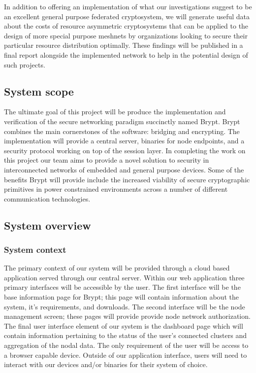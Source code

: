 \documentclass[tikz,a4paper,titlepage]{article}
\begin{document}
In addition to offering an implementation of what our investigations suggest to be an excellent general purpose federated cryptosystem, we will generate useful data about the costs of resource asymmetric cryptosystems that can be applied to the design of more special purpose meshnets by organizations looking to secure their particular resource distribution optimally. These findings will be published in a final report alongside the implemented network to help in the potential design of such projects.

\subsection{System scope}
The ultimate goal of this project will be produce the implementation and verification of the secure networking paradigm succinctly named Brypt. Brypt combines the main cornerstones of the software: bridging and encrypting. The implementation will provide a central server, binaries for node endpoints, and a security protocol working on top of the session layer. In completing the work on this project our team aims to provide a novel solution to security in interconnected networks of embedded and general purpose devices. Some of the benefits Brypt will provide include the increased viability of secure cryptographic primitives in power constrained environments across a number of different communication technologies. 

\subsection{System overview}
\subsubsection{System context}
The primary context of our system will be provided through a cloud based application served through our central server. Within our web application three primary interfaces will be accessible by the user. The first interface will be the base information page for Brypt; this page will contain information about the system, it’s requirements, and downloads. The second interface will be the node management screen; these pages will provide provide node network authorization. The final user interface element of our system is the dashboard page which will contain information pertaining to the status of the user’s connected clusters and aggregation of the nodal data. The only requirement of the user will be access to a browser capable device. Outside of our application interface, users will need to interact with our devices and/or binaries for their system of choice. 
\end{document}
